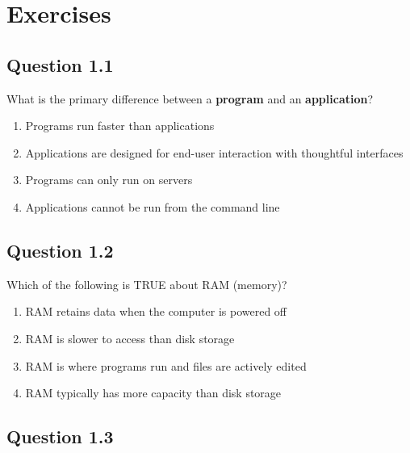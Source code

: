 \documentclass[
  letterpaper,
  DIV=11,
  numbers=noendperiod]{scrreprt}
\providecommand{\tightlist}{%
  \setlength{\itemsep}{0pt}\setlength{\parskip}{0pt}}
\begin{document}
\section{Exercises}\label{exercises}

\subsection{Question 1.1}\label{question-1.1}

What is the primary difference between a \textbf{program} and an
\textbf{application}?

\begin{enumerate}
\def\labelenumi{\Alph{enumi})}
\tightlist
\item
  Programs run faster than applications\\
\item
  Applications are designed for end-user interaction with thoughtful
  interfaces\\
\item
  Programs can only run on servers\\
\item
  Applications cannot be run from the command line
\end{enumerate}

\subsection{Question 1.2}\label{question-1.2}

Which of the following is TRUE about RAM (memory)?

\begin{enumerate}
\def\labelenumi{\Alph{enumi})}
\tightlist
\item
  RAM retains data when the computer is powered off\\
\item
  RAM is slower to access than disk storage\\
\item
  RAM is where programs run and files are actively edited\\
\item
  RAM typically has more capacity than disk storage
\end{enumerate}

\subsection{Question 1.3}\label{question-1.3}
\end{document}
